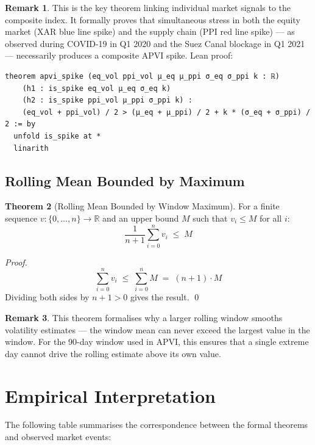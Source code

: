 \documentclass[12pt, a4paper]{article}
\theoremstyle{definition}
\newtheorem{theorem}{Theorem}[section]
\newtheorem{remark}[theorem]{Remark}
\begin{document}
\begin{remark}
This is the key theorem linking individual market signals to the
composite index. It formally proves that simultaneous stress in both
the equity market (XAR blue line spike) and the supply chain (PPI red
line spike) — as observed during COVID-19 in Q1 2020 and the Suez Canal
blockage in Q1 2021 — necessarily produces a composite APVI spike.
Lean proof:
\begin{lstlisting}
theorem apvi_spike (eq_vol ppi_vol μ_eq μ_ppi σ_eq σ_ppi k : ℝ)
    (h1 : is_spike eq_vol μ_eq σ_eq k)
    (h2 : is_spike ppi_vol μ_ppi σ_ppi k) :
    (eq_vol + ppi_vol) / 2 > (μ_eq + μ_ppi) / 2 + k * (σ_eq + σ_ppi) / 2 := by
  unfold is_spike at *
  linarith
\end{lstlisting}
\end{remark}

\subsection{Rolling Mean Bounded by Maximum}

\begin{theorem}[Rolling Mean Bounded by Window Maximum]
\label{thm:mean_bound}
For a finite sequence $v : \{0,\ldots,n\} \to \mathbb{R}$ and an upper
bound $M$ such that $v_i \leq M$ for all $i$:
\[
    \frac{1}{n+1}\sum_{i=0}^{n} v_i \;\leq\; M
\]
\end{theorem}

\begin{proof}
\[
    \sum_{i=0}^{n} v_i \;\leq\; \sum_{i=0}^{n} M \;=\; (n+1)\cdot M
\]
Dividing both sides by $n+1 > 0$ gives the result. \qed
\end{proof}

\begin{remark}
This theorem formalises why a larger rolling window smooths volatility
estimates — the window mean can never exceed the largest value in the
window. For the 90-day window used in APVI, this ensures that a single
extreme day cannot drive the rolling estimate above its own value.
\end{remark}

\section{Empirical Interpretation}

The following table summarises the correspondence between the formal
theorems and observed market events:
\end{document}
